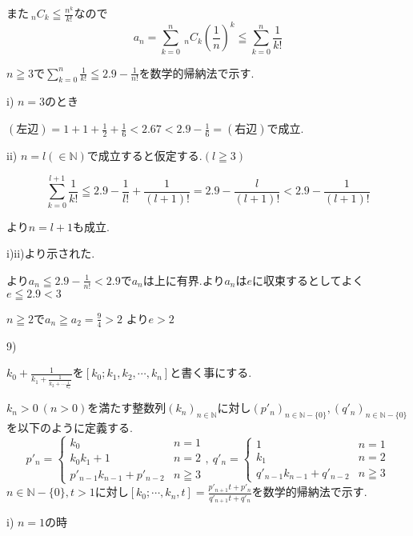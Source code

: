 \documentclass{jsarticle}
\begin{document}
              また$ \ _nC_k\leqq \frac{n^k}{k!}$なので
               \[a_n=\sum_{k=0}^n \ _nC_k (\frac{1}{n})^k\leqq \sum_{k=0}^{n} \frac{1}{k!}\]
               
               $n\geqq3$で$\displaystyle \sum_{k=0}^n\frac{1}{k!} \leqq 2.9 - \frac{1}{n!}$を数学的帰納法で示す.
               
               i) $n=3$のとき
               
               $(左辺)=1+1+\frac{1}{2}+\frac{1}{6}<2.67 < 2.9-\frac{1}{6}=(右辺)$で成立.
               
               ii) $n=l(\in \mathbb{N})$で成立すると仮定する.$(l\geqq 3)$
               
               \[\sum_{k=0}^{l+1}\frac{1}{k!} \leqq 2.9-\frac{1}{l!}+\frac{1}{(l+1)!}=2.9-\frac{l}{(l+1)!}<2.9-\frac{1}{(l+1)!}\]
               
               より$n=l+1$も成立.
               
               i)ii)より示された.
               
               より$a_n\leqq 2.9 -  \frac{1}{n!} < 2.9$で$a_n$は上に有界.より$a_n$は$e$に収束するとしてよく$e \leqq 2.9 < 3$
              
              $n\geqq 2$で$a_n\geqq a_2 = \frac{9}{4}>2$
              より$e>2$            
              
       9)
       
       $k_0+\frac{1}{k_1+\frac{1}{k_2+\cdots \frac{1}{k_n}}}$を$[k_0;k_1,k_2,\cdots,k_n]$と書く事にする.
       
       $k_n>0 \ (n > 0)$を満たす整数列$(k_n)_{n\in\mathbb{N}}$に対し$(p'_n)_{n\in\mathbb{N}-\{0\}},(q'_n)_{n\in\mathbb{N}-\{0\}}$を以下のように定義する.
       \[p'_n=\begin{cases}
       k_0 & n=1 \\
       k_0k_1+1 & n=2 \\
       p'_{n-1}k_{n-1}+p'_{n-2} & n\geqq 3
       \end{cases}, \ q'_n=\begin{cases}
       1 & n=1 \\
       k_1 & n=2 \\
       q'_{n-1}k_{n-1}+q'_{n-2} & n\geqq 3
       \end{cases}\]
       $n\in \mathbb{N}-\{0\},t>1$に対し$[k_0;\cdots ,k_n,t]=\frac{p'_{n+1}t+p'_n}{q'_{n+1}t+q'_n}$を数学的帰納法で示す.
       
       i) $n=1$の時
       
\end{document}
